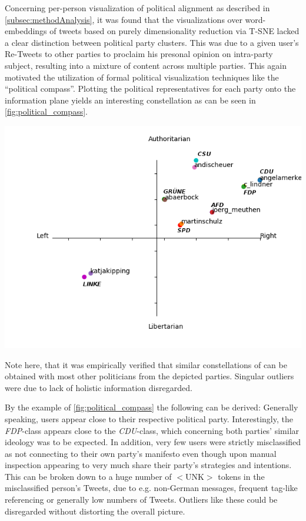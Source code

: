 \documentclass[10pt, oneside]{article}
\newenvironment{Figure}
	{\par\medskip\noindent\minipage{\linewidth}}
	{\endminipage\par\medskip}
\begin{document}
\begin{multicols}{2}
Concerning per-person visualization of political alignment as described in \autoref{subsec:methodAnalysis}, it was found that the visualizations over word-embeddings of tweets based on purely dimensionality reduction via T-SNE lacked a clear distinction between political party clusters. This was due to a given user's Re-Tweets to other parties to proclaim his presonal opinion on intra-party subject, resulting into a mixture of content across multiple parties.
This again motivated the utilization of formal political visualization techniques like the ``political compass''. Plotting the political representatives for each party onto the information plane yields an interesting constellation as can be seen in \autoref{fig:political_compass}.

\begin{Figure}
	\centering
	\includegraphics[width=\linewidth]{images/Political_Compass-final.png}
	\label{fig:political_compass}
\end{Figure}

Note here, that it was empirically verified that similar constellations of can be obtained with most other politicians from the depicted parties. Singular outliers were due to lack of holistic information disregarded.

By the example of \autoref{fig:political_compass} the following can be derived: Generally speaking, users appear close to their respective political party. Interestingly, the \emph{FDP}-class appears close to the \emph{CDU}-class, which concerning both parties' similar ideology was to be expected. In addition, very few users were strictly misclassified as not connecting to their own party's manifesto even though upon manual inspection appearing to very much share their party's strategies and intentions. This can be broken down to a huge number of $<$UNK$>$ tokens in the misclassified person's Tweets, due to e.g. non-German messages, frequent tag-like referencing or generally low numbers of Tweets. Outliers like these could be disregarded without distorting the overall picture.



\end{multicols}
\end{document}
